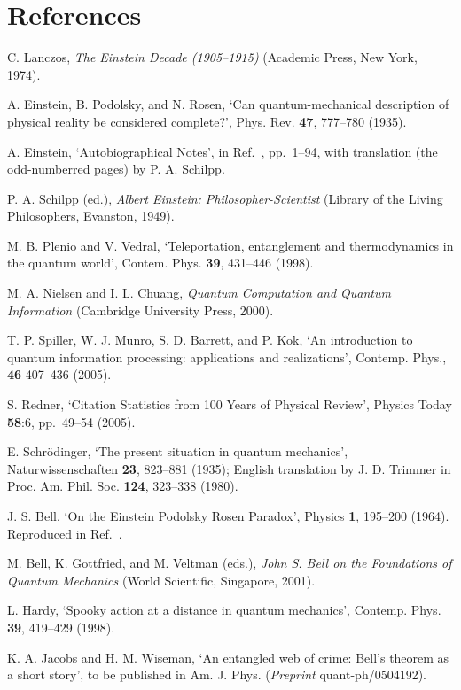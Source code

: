 \documentclass[12pt]{iopart}
\begin{document}
\section*{References}
\begin{thebibliography}{10}
C. Lanczos, 
{\em The Einstein Decade (1905--1915)}
(Academic Press, New York, 1974).

A. Einstein, B. Podolsky, and N. Rosen, `Can quantum-mechanical
description of physical reality be considered complete?', Phys.
Rev. {\bf 47}, 777--780 (1935).

A. Einstein, `Autobiographical Notes', in Ref.~\cite{Sch49}, 
pp.~1--94, with translation (the odd-numberred pages) by P. A. Schilpp. 

P. A. Schilpp (ed.), {\em Albert Einstein: Philosopher-Scientist}
(Library of the Living Philosophers, Evanston, 1949).

M. B. Plenio and V. Vedral,
`Teleportation, entanglement and thermodynamics in the 
quantum world', Contem. Phys. {\bf 39}, 431--446 (1998).

M. A. Nielsen and I. L. Chuang, 
{\em Quantum Computation and Quantum Information}
(Cambridge University Press, 2000).

T. P. Spiller, W. J. Munro, S. D. Barrett, and P. Kok,
`An introduction to quantum information processing:
applications and realizations',
Contemp. Phys., {\bf 46}  407--436 (2005).

S. Redner, 
`Citation Statistics from 100 Years of Physical Review',
Physics Today {\bf 58}:6, pp.~49--54 (2005).

E. Schr\"odinger, `The present situation in quantum mechanics',
Naturwissenschaften {\bf 23}, 823--881 (1935); English translation
by J. D. Trimmer in Proc. Am. Phil. Soc. {\bf 124}, 323--338 (1980).

J. S. Bell, `On the Einstein Podolsky Rosen Paradox', Physics {\bf
1}, 195--200 (1964). Reproduced in Ref.~\cite{BellCollection}.

M. Bell, K. Gottfried, and M. Veltman (eds.), {\em John S. Bell on
the Foundations of Quantum Mechanics} (World Scientific, Singapore,
2001).

L. Hardy, `Spooky action at a distance in quantum mechanics', 
Contemp. Phys. {\bf 39}, 419--429 (1998).

K. A. Jacobs and H. M. Wiseman, `An entangled web of crime: Bell's
theorem as a short story', to be published in Am. J. Phys. ({\em Preprint} quant-ph/0504192).


\end{thebibliography}
\end{document}

